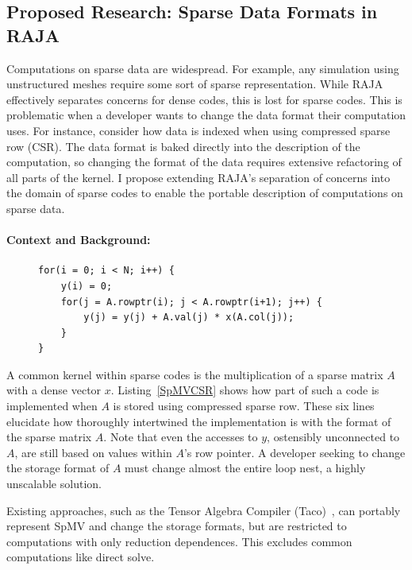 \documentclass{article}
\begin{document}
\subsection{Proposed Research: Sparse Data Formats in RAJA}
\label{Sec:Work3}
Computations on sparse data are widespread. 
For example, any simulation using unstructured meshes require some sort of sparse representation.
While RAJA effectively separates concerns for dense codes, this is lost for sparse codes.
This is problematic when a developer wants to change the data format their computation uses.
For instance, consider how data is indexed when using compressed sparse row (CSR). 
The data format is baked directly into the description of the computation, so changing the format of the data requires extensive refactoring of all parts of the kernel.
I propose extending RAJA's separation of concerns into the domain of sparse codes to enable the portable description of computations on sparse data.

\paragraph{Context and Background:}
\begin{figure}
\begin{lstlisting}[caption={CSR-stored sparse matrix vector multiplication},label={SpMVCSR}]
for(i = 0; i < N; i++) {
    y(i) = 0;
    for(j = A.rowptr(i); j < A.rowptr(i+1); j++) {
        y(j) = y(j) + A.val(j) * x(A.col(j));
    }
}
\end{lstlisting}
\end{figure}

A common kernel within sparse codes is the multiplication of a sparse matrix $A$ with a dense vector $x$.
Listing~\ref{SpMVCSR} shows how part of such a code is implemented when $A$ is stored using compressed sparse row.
These six lines elucidate how thoroughly intertwined the implementation is with the format of the sparse matrix $A$.
Note that even the accesses to $y$, ostensibly unconnected to $A$, are still based on values within $A$'s row pointer.
A developer seeking to change the storage format of $A$ must change almost the entire loop nest, a highly unscalable solution.

Existing approaches, such as the Tensor Algebra Compiler (Taco)~\cite{kjolstad2017tensor}, can portably represent SpMV and change the storage formats, but are restricted to computations with only reduction dependences.
This excludes common computations like direct solve.
\end{document}
